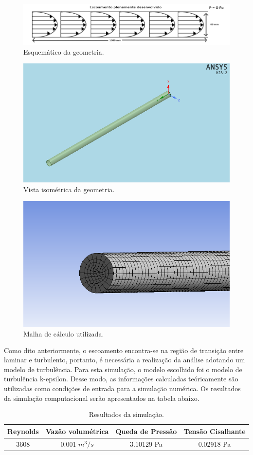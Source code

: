 \documentclass[12pt]{article}
\begin{document}
\begin{figure}[H]
    \centering
    \includegraphics[width=.6\textwidth]{fig/schematics.png}
    \caption{Esquemático da geometria.}
		\label{fig:schematics}
\end{figure}

\begin{figure}[H]
    \centering
    \includegraphics[width=.5\textwidth]{fig/isometric_view.png}
    \caption{Vista isométrica da geometria.}
		\label{fig:isometric}
\end{figure}

\begin{figure}[H]
    \centering
    \includegraphics[width=.5\textwidth]{fig/mesh.png}
    \caption{Malha de cálculo utilizada.}
		\label{fig:isometric}
\end{figure}

Como dito anteriormente, o escoamento encontra-se na região de transição entre laminar e turbulento, portanto, é necessária a realização da análise adotando um modelo de turbulência. Para esta simulação, o modelo escolhido foi o modelo de turbulência k-epsilon. Desse modo, as informações calculadas teóricamente são utilizadas como condições de entrada para a simulação numérica. Os resultados da simulação computacional serão apresentados na tabela abaixo. 

\begin{table}[ht]
\begin{center}
\begin{tabular}{cccc} 
\hline
\textbf{Reynolds} & \textbf{Vazão volumétrica} & \textbf{Queda de Pressão} & \textbf{Tensão Cisalhante}\\
\hline
3608 &   0.001 $m^3/s$ & 3.10129 Pa & 0.02918 Pa \\
\hline
\end{tabular}
\caption{Resultados da simulação.}
\label{tbl:resultados} %
\end{center}
\end{table}
\end{document}
